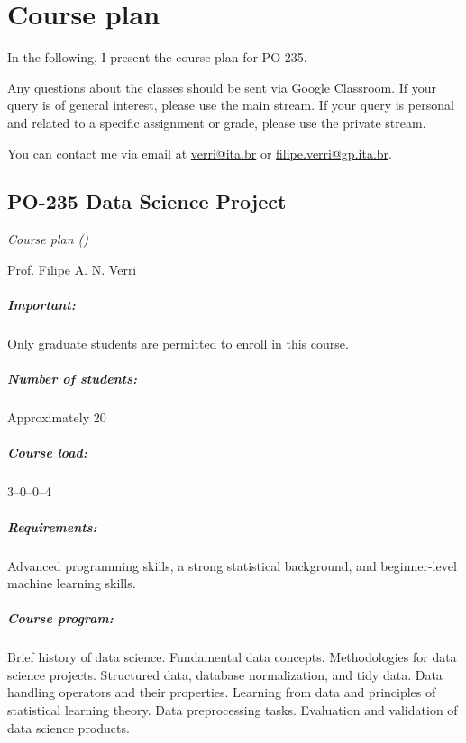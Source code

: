 \chapter*{Course plan}
\thispagestyle{empty}

In the following, I present the course plan for PO-235.

Any questions about the classes should be sent via Google Classroom.  If your query is of
general interest, please use the main stream.  If your query is personal and related to
a specific assignment or grade, please use the private stream.

You can contact me via email at \href{mailto:verri@ita.br}{verri@ita.br} or
\href{mailto:filipe.verri@gp.ita.br}{filipe.verri@gp.ita.br}.

\newpage
\thispagestyle{empty}
\section*{PO-235 Data Science Project}

\emph{Course plan (\the\year{})}

Prof. Filipe A. N. Verri

\paragraph{Important:} Only graduate students are permitted to enroll in this course.

\paragraph{Number of students:} Approximately 20

\paragraph{Course load:} 3--0--0--4

\paragraph{Requirements:} Advanced programming skills, a strong statistical background, and
beginner-level machine learning skills.

\paragraph{Course program:}
Brief history of data science.  Fundamental data concepts.  Methodologies for data science
projects.  Structured data, database normalization, and tidy data.  Data handling
operators and their properties.  Learning from data and principles of statistical learning
theory.  Data preprocessing tasks.  Evaluation and validation of data science products.

